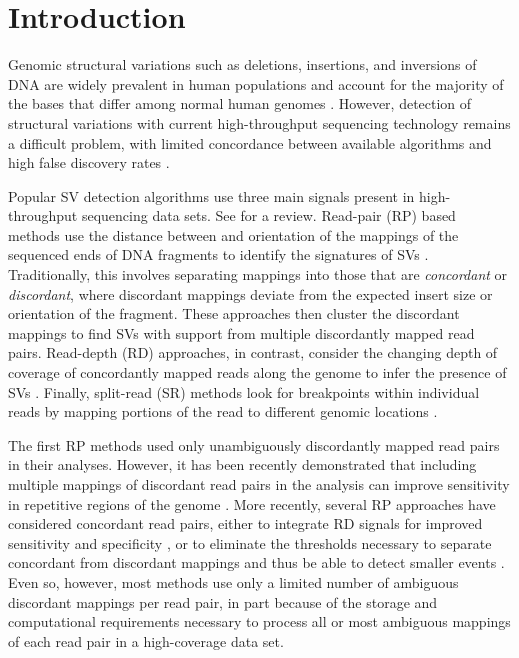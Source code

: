 \documentclass[11pt]{article}
\begin{document}
\newpage

\section{Introduction}

Genomic structural variations such as deletions, insertions, and inversions of DNA are widely prevalent in human populations and account for the majority of the bases that differ among normal human genomes \autocite{Mills:2011p1611, Conrad:2010ja}. However, detection of structural variations with current high-throughput sequencing technology remains a difficult problem, with limited concordance between available algorithms and high false discovery rates \autocite{Mills:2011p1611}.

Popular SV detection algorithms use three main signals present in high-throughput sequencing data sets. See \textcite{Alkan:2011p547} for a review. Read-pair (RP) based methods use the distance between and orientation of the mappings of the sequenced ends of DNA fragments to identify the signatures of SVs \autocite{Campbell:2008p539,Chen:2009p3,Hormozdiari:2009p284,Sindi:2009gu,Korbel:2009dy}. Traditionally, this involves separating mappings into those that are \emph{concordant} or \emph{discordant}, where discordant mappings deviate from the expected insert size or orientation of the fragment. These approaches then cluster the discordant mappings to find SVs with support from multiple discordantly mapped read pairs. Read-depth (RD) approaches, in contrast, consider the changing depth of coverage of concordantly mapped reads along the genome to infer the presence of SVs \autocite{Abyzov:2011bk,Alkan:2009cr,Yoon:2009kb,Chiang:2009di}. Finally, split-read (SR) methods look for breakpoints within individual reads by mapping portions of the read to different genomic locations \autocite{Wang:2011p1607,Ye:2009p2}.

The first RP methods used only unambiguously discordantly mapped read pairs in their analyses. However, it has been recently demonstrated that including multiple mappings of discordant read pairs in the analysis can improve sensitivity in repetitive regions of the genome \autocite{Hormozdiari:2009p284,Quinlan:2010gf}. More recently, several RP approaches have considered concordant read pairs, either to integrate RD signals for improved sensitivity and specificity \autocite{Sindi:2012kk,Michaelson:2012fj,Chiara:2012ey}, or to eliminate the thresholds necessary to separate concordant from discordant mappings and thus be able to detect smaller events \autocite{Marschall:2012ek}. Even so, however, most methods use only a limited number of ambiguous discordant mappings per read pair, in part because of the storage and computational requirements necessary to process all or most ambiguous mappings of each read pair in a high-coverage data set.
\end{document}
